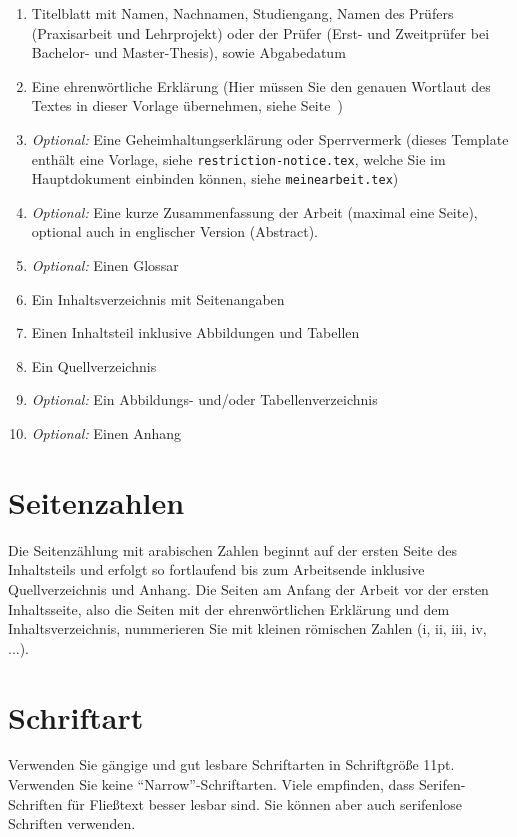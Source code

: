 \begin{enumerate}
    \item Titelblatt mit Namen, Nachnamen, Studiengang, Namen des Prüfers (Praxisarbeit und Lehrprojekt) oder der Prüfer (Erst- und Zweitprüfer bei Bachelor- und Master-Thesis), sowie Abgabedatum
    \item Eine ehrenwörtliche Erklärung (Hier müssen Sie den genauen Wortlaut des Textes in dieser Vorlage übernehmen, siehe Seite~\pageref{chap:erklaerung-selbstaendigkeit})
    \item \textit{Optional:} Eine Geheimhaltungserklärung oder Sperrvermerk (dieses Template enthält eine Vorlage, siehe \texttt{restriction-notice.tex}, welche Sie im Hauptdokument einbinden können, siehe \texttt{meinearbeit.tex})
    \item \textit{Optional:} Eine kurze Zusammenfassung der Arbeit (maximal eine Seite), optional auch in englischer Version (Abstract).
    \item  \textit{Optional:} Einen Glossar
    \item Ein Inhaltsverzeichnis mit Seitenangaben
    \item Einen Inhaltsteil inklusive Abbildungen und Tabellen
    \item Ein Quellverzeichnis
    \item \textit{Optional:} Ein Abbildungs- und/oder Tabellenverzeichnis
    \item \textit{Optional:} Einen Anhang
\end{enumerate}

\section{Seitenzahlen}

Die Seitenzählung mit arabischen Zahlen beginnt auf der ersten Seite des Inhaltsteils und erfolgt so fortlaufend bis zum Arbeitsende inklusive Quellverzeichnis und Anhang. Die Seiten am Anfang der Arbeit vor der ersten Inhaltsseite, also die Seiten mit der ehrenwörtlichen Erklärung und dem Inhaltsverzeichnis, nummerieren Sie mit kleinen römischen Zahlen (i, ii, iii, iv, ...).

\section{Schriftart}

Verwenden Sie gängige und gut lesbare Schriftarten in Schriftgröße 11pt. Verwenden Sie keine \enquote{Narrow}-Schriftarten. Viele empfinden, dass Serifen-Schriften für Fließtext besser lesbar sind. Sie können aber auch serifenlose Schriften verwenden. 

